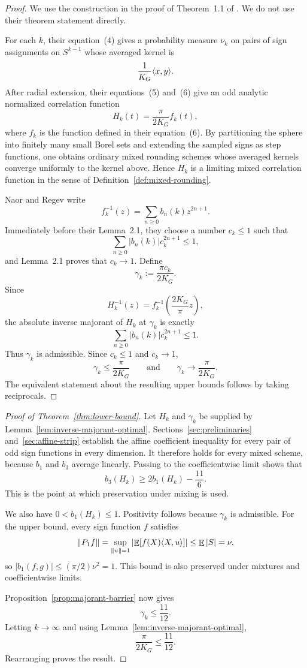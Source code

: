 \begin{proof}
We use the construction in the proof of Theorem~1.1 of \cite{naor2014krivine}. We do not use their theorem statement directly.

For each $k$, their equation~(4) gives a probability measure $\nu_k$ on pairs of sign assignments on $S^{k-1}$ whose averaged kernel is
\[
        \frac{1}{K_G}\langle x,y\rangle.
\]
After radial extension, their equations~(5) and~(6) give an odd analytic normalized correlation function
\[
        H_k(t)=\frac{\pi}{2K_G}f_k(t),
\]
where $f_k$ is the function defined in their equation~(6). By partitioning the sphere into finitely many small Borel sets and extending the sampled signs as step functions, one obtains ordinary mixed rounding schemes whose averaged kernels converge uniformly to the kernel above. Hence $H_k$ is a limiting mixed correlation function in the sense of Definition~\ref{def:mixed-rounding}.

Naor and Regev write
\[
        f_k^{-1}(z)=\sum_{n\ge0}b_n(k)z^{2n+1}.
\]
Immediately before their Lemma~2.1, they choose a number $c_k\le1$ such that
\[
        \sum_{n\ge0}|b_n(k)|c_k^{2n+1}\le1,
\]
and Lemma~2.1 proves that $c_k\to1$. Define
\[
        \gamma_k:=\frac{\pi c_k}{2K_G}.
\]
Since
\[
        H_k^{-1}(z)=f_k^{-1}\left(\frac{2K_G}{\pi}z\right),
\]
the absolute inverse majorant of $H_k$ at $\gamma_k$ is exactly
\[
        \sum_{n\ge0}|b_n(k)|c_k^{2n+1}\le1.
\]
Thus $\gamma_k$ is admissible. Since $c_k\le1$ and $c_k\to1$,
\[
        \gamma_k\le\frac{\pi}{2K_G}
        \qquad\text{and}\qquad
        \gamma_k\longrightarrow\frac{\pi}{2K_G}.
\]
The equivalent statement about the resulting upper bounds follows by taking reciprocals.
\end{proof}

\begin{proof}[Proof of Theorem~\ref{thm:lower-bound}]
Let $H_k$ and $\gamma_k$ be supplied by Lemma~\ref{lem:inverse-majorant-optimal}. Sections~\ref{sec:preliminaries} and~\ref{sec:affine-strip} establish the affine coefficient inequality for every pair of odd sign functions in every dimension. It therefore holds for every mixed scheme, because $b_1$ and $b_3$ average linearly. Passing to the coefficientwise limit shows that
\[
        b_3(H_k)\ge2b_1(H_k)-\frac{11}{6}.
\]
This is the point at which preservation under mixing is used.

We also have $0<b_1(H_k)\le1$. Positivity follows because $\gamma_k$ is admissible. For the upper bound, every sign function $f$ satisfies
\[
        \lVert P_1f\rVert
        =\sup_{\lVert u\rVert=1}\left|\mathop{\mathbb{E}}[f(X)\langle X,u\rangle]\right|
        \le\mathop{\mathbb{E}}|S|=\nu,
\]
so $|b_1(f,g)|\le(\pi/2)\nu^2=1$. This bound is also preserved under mixtures and coefficientwise limits.

Proposition~\ref{prop:majorant-barrier} now gives
\[
        \gamma_k\le\frac{11}{12}.
\]
Letting $k\to\infty$ and using Lemma~\ref{lem:inverse-majorant-optimal},
\[
        \frac{\pi}{2K_G}\le\frac{11}{12}.
\]
Rearranging proves the result.
\end{proof}
